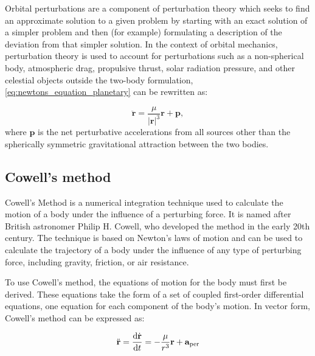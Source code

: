 Orbital perturbations are a component of perturbation theory which seeks to find an approximate solution to a given problem by starting with an exact solution of a simpler problem and then (for example) formulating a description of the deviation from that simpler solution. In the context of orbital mechanics, perturbation theory is used to account for perturbations such as a non-spherical body, atmospheric drag, propulsive thrust, solar radiation pressure, and other celestial objects outside the two-body formulation, \autoref{eq:newtons_equation_planetary} can be rewritten as:

\begin{equation}
    \ddot{\mathbf{r}}=\frac{\mu}{|\mathbf{r}|^3}\mathbf{r}+\mathbf{p},
    \label{eq:newtons_equation_planetary_with_p}
\end{equation}
where $\mathbf{p}$ is the net perturbative accelerations from all sources other than the spherically symmetric gravitational attraction between the two bodies.

\subsection{Cowell's method}

Cowell's Method is a numerical integration technique used to calculate the motion of a body under the influence of a perturbing force. It is named after British astronomer Philip H. Cowell, who developed the method in the early 20th century. The technique is based on Newton's laws of motion and can be used to calculate the trajectory of a body under the influence of any type of perturbing force, including gravity, friction, or air resistance.

To use Cowell's method, the equations of motion for the body must first be derived. These equations take the form of a set of coupled first-order differential equations, one equation for each component of the body's motion. In vector form, Cowell's method can be expressed as:

\begin{equation}
    \begin{aligned}
        \ddot{\mathbf{r}}=\dv{\dot{\mathbf{r}}}{t}=-\frac{\mu}{r^3}\mathbf{r} + \mathbf{a}_{\mathrm{per}}
    \end{aligned}
\end{equation}


